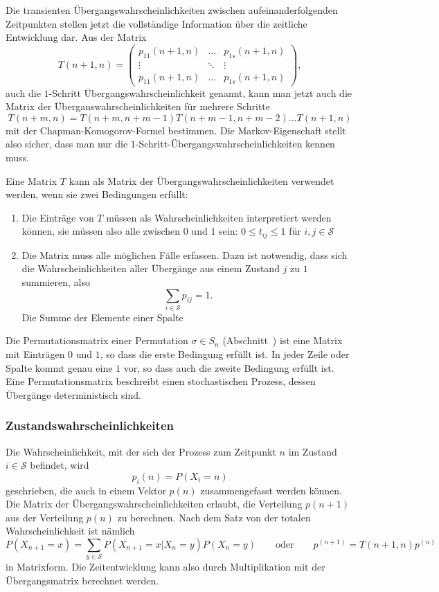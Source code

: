 Die transienten Übergangswahrscheinlichkeiten zwischen aufeinanderfolgenden
Zeitpunkten stellen jetzt die vollständige Information über die
zeitliche Entwicklung dar.
Aus der Matrix
\[
T(n+1,n)
=
\begin{pmatrix}
p_{11}(n+1,n) & \dots  & p_{1s}(n+1,n)\\
\vdots        & \ddots & \vdots       \\
p_{11}(n+1,n) & \dots  & p_{1s}(n+1,n)
\end{pmatrix},
\]
auch die $1$-Schritt Übergangswahrscheinlichkeit genannt, kann man jetzt
auch die Matrix der Überganswahrscheinlichkeiten für mehrere Schritte
\[
T(n+m,n)
=
T(n+m,n+m-1)
T(n+m-1,n+m-2)
\dots
T(n+1,n)
\]
mit der Chapman-Komogorov-Formel bestimmen.
Die Markov-Eigenschaft stellt also sicher, dass man nur die 
$1$-Schritt-Übergangswahrscheinlichkeiten kennen muss.

Eine Matrix $T$ kann als Matrix der Übergangswahrscheinlichkeiten
verwendet werden, wenn sie zwei Bedingungen erfüllt:
\begin{enumerate}
\item Die Einträge von $T$ müssen als Wahrscheinlichkeiten interpretiert
werden können, sie müssen also alle zwischen $0$ und $1$ sein:
$0\le t_{ij}\le 1$ für $i,j\in\mathcal{S}$
\item Die Matrix muss alle möglichen Fälle erfassen.
Dazu ist notwendig, dass sich die Wahrscheinlichkeiten aller Übergänge
aus einem Zustand $j$ zu $1$ summieren, also
\[
\sum_{i\in\mathcal{S}} p_{ij} = 1.
\]
Die Summe der Elemente einer Spalte 
\end{enumerate}

\begin{beispiel}
Die Permutationsmatrix einer Permutation $\sigma\in S_n$ 
(Abschnitt~\label{buch:section:permutationsmatrizen})
ist eine Matrix mit Einträgen $0$ und $1$, so dass die erste Bedingung
erfüllt ist.
In jeder Zeile oder Spalte kommt genau eine $1$ vor, so dass auch die
zweite Bedingung erfüllt ist.
Eine Permutationsmatrix beschreibt einen stochastischen Prozess, dessen
Übergänge deterministisch sind.
\end{beispiel}

\subsubsection{Zustandswahrscheinlichkeiten}
Die Wahrscheinlichkeit, mit der sich der Prozess zum Zeitpunkt $n$
im Zustand $i\in\mathcal{S}$ befindet, wird
\[
p_i(n)
=
P(X_i=n)
\]
geschrieben, die auch in einem Vektor $p(n)$ zusammengefasst
werden können.
Die Matrix der Übergangswahrscheinlichkeiten erlaubt, die Verteilung
$p(n+1)$ aus der Verteilung $p(n)$ zu berechnen.
Nach dem Satz von der totalen Wahrscheinlichkeit ist nämlich
\[
P(X_{n+1}=x)
=
\sum_{y\in\mathcal{S}} 
P(X_{n+1}=x|X_n=y) P(X_n=y)
\qquad\text{oder}\qquad
p^{(n+1)} = T(n+1,n) p^{(n)}
\]
in Matrixform.
Die Zeitentwicklung kann also durch Multiplikation mit der Übergangsmatrix
berechnet werden.

